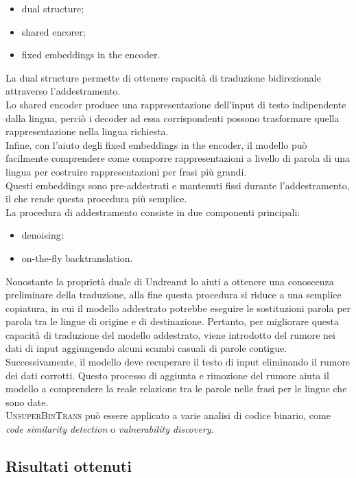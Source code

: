 \documentclass[12pt,a4paper,openright,twoside]{report}
\begin{document}
\begin{itemize}
    \item dual structure;
    \item shared encorer;
    \item fixed embeddings in the encoder.
\end{itemize}
La dual structure permette di ottenere capacità di traduzione  bidirezionale attraverso l'addestramento. \\Lo shared encoder produce una rappresentazione dell'input di testo indipendente dalla lingua, perciò i decoder ad essa corrispondenti possono trasformare quella rappresentazione nella lingua richiesta.\\
Infine, con l'aiuto degli fixed embeddings in the encoder, il modello può facilmente comprendere come comporre rappresentazioni a livello di parola di una lingua per costruire rappresentazioni per frasi più grandi.\\
Questi embeddings sono pre-addestrati e mantenuti fissi durante l'addestramento, il che rende questa procedura più semplice.\\
La procedura di addestramento consiste in due componenti principali:
\begin{itemize}
    \item denoising;
    \item on-the-fly backtranslation.
\end{itemize}
Nonostante la proprietà duale di Undreamt lo aiuti a ottenere una conoscenza preliminare della traduzione, alla fine questa procedura si riduce a una semplice copiatura, in cui il modello addestrato potrebbe eseguire le sostituzioni parola per parola tra le lingue di origine e di destinazione. Pertanto, per migliorare questa capacità di traduzione del modello addestrato, viene introdotto del rumore nei dati di input aggiungendo alcuni scambi casuali di parole contigue.\\
Successivamente, il modello deve recuperare il testo di input eliminando il rumore dei dati corrotti. Questo processo di aggiunta e rimozione del rumore aiuta il modello a comprendere la reale relazione tra le parole nelle frasi per le lingue che sono date.\\
\textsc{UnsuperBinTrans} può essere applicato a varie analisi di codice binario, come \textit{code similarity detection} o \textit{vulnerability discovery}.

\subsection{Risultati ottenuti}
\end{document}
